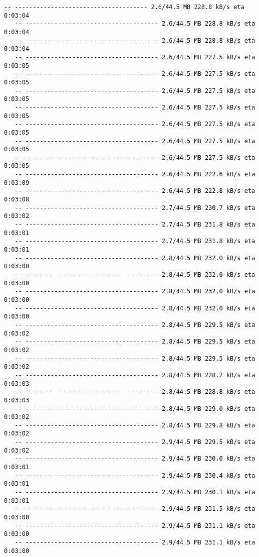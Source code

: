 \documentclass[11pt]{article}
\begin{document}
\begin{Verbatim}[commandchars=\\\{\}]
   -- ------------------------------------- 2.6/44.5 MB 228.8 kB/s eta 0:03:04
   -- ------------------------------------- 2.6/44.5 MB 228.8 kB/s eta 0:03:04
   -- ------------------------------------- 2.6/44.5 MB 228.8 kB/s eta 0:03:04
   -- ------------------------------------- 2.6/44.5 MB 227.5 kB/s eta 0:03:05
   -- ------------------------------------- 2.6/44.5 MB 227.5 kB/s eta 0:03:05
   -- ------------------------------------- 2.6/44.5 MB 227.5 kB/s eta 0:03:05
   -- ------------------------------------- 2.6/44.5 MB 227.5 kB/s eta 0:03:05
   -- ------------------------------------- 2.6/44.5 MB 227.5 kB/s eta 0:03:05
   -- ------------------------------------- 2.6/44.5 MB 227.5 kB/s eta 0:03:05
   -- ------------------------------------- 2.6/44.5 MB 227.5 kB/s eta 0:03:05
   -- ------------------------------------- 2.6/44.5 MB 222.6 kB/s eta 0:03:09
   -- ------------------------------------- 2.6/44.5 MB 222.8 kB/s eta 0:03:08
   -- ------------------------------------- 2.7/44.5 MB 230.7 kB/s eta 0:03:02
   -- ------------------------------------- 2.7/44.5 MB 231.8 kB/s eta 0:03:01
   -- ------------------------------------- 2.7/44.5 MB 231.8 kB/s eta 0:03:01
   -- ------------------------------------- 2.8/44.5 MB 232.0 kB/s eta 0:03:00
   -- ------------------------------------- 2.8/44.5 MB 232.0 kB/s eta 0:03:00
   -- ------------------------------------- 2.8/44.5 MB 232.0 kB/s eta 0:03:00
   -- ------------------------------------- 2.8/44.5 MB 232.0 kB/s eta 0:03:00
   -- ------------------------------------- 2.8/44.5 MB 229.5 kB/s eta 0:03:02
   -- ------------------------------------- 2.8/44.5 MB 229.5 kB/s eta 0:03:02
   -- ------------------------------------- 2.8/44.5 MB 229.5 kB/s eta 0:03:02
   -- ------------------------------------- 2.8/44.5 MB 228.2 kB/s eta 0:03:03
   -- ------------------------------------- 2.8/44.5 MB 228.8 kB/s eta 0:03:03
   -- ------------------------------------- 2.8/44.5 MB 229.0 kB/s eta 0:03:02
   -- ------------------------------------- 2.8/44.5 MB 229.8 kB/s eta 0:03:02
   -- ------------------------------------- 2.9/44.5 MB 229.5 kB/s eta 0:03:02
   -- ------------------------------------- 2.9/44.5 MB 230.0 kB/s eta 0:03:01
   -- ------------------------------------- 2.9/44.5 MB 230.4 kB/s eta 0:03:01
   -- ------------------------------------- 2.9/44.5 MB 230.1 kB/s eta 0:03:01
   -- ------------------------------------- 2.9/44.5 MB 231.5 kB/s eta 0:03:00
   -- ------------------------------------- 2.9/44.5 MB 231.1 kB/s eta 0:03:00
   -- ------------------------------------- 2.9/44.5 MB 231.1 kB/s eta 0:03:00

\end{Verbatim}
\end{document}
